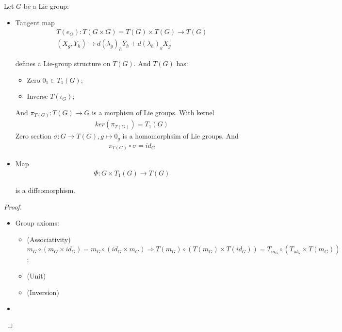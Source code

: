 \documentclass[Total.tex]{subfiles}
\begin{document}
				\begin{lemma} Let $G$ be a Lie group:
					\begin{itemize}
						\item Tangent map
						\begin{gather*}
							T(e_G):T(G\times G)=T(G)\times T(G)\rightarrow T(G)\\
							(X_g,Y_h)\mapsto d(\lambda_g)_h Y_h+d(\lambda_h)_g X_g
						\end{gather*}
						
						defines a Lie-group structure on $T(G)$. And $T(G)$ has:
						\begin{itemize}
							\item Zero $0_1\in T_1(G)$;
							\item Inverse $T(\iota_G)$;
						\end{itemize}
						And $\pi_{T(G)}:T(G)\rightarrow G$ is a morphism of Lie groups. With kernel
						\begin{gather*}
							ker(\pi_{T(G)})=T_1(G)
						\end{gather*}
						Zero section $\sigma:G\rightarrow T(G),g\mapsto 0_g$ is a homomorphsim of Lie groups. And
						\begin{gather*}
							\pi_{T(G)}\circ \sigma=id_{G}
						\end{gather*}
						
						
						\item Map
						\begin{gather*}
							\Phi:G\times T_1(G)\rightarrow T(G)
						\end{gather*}
						
						is a diffeomorphism.
					\end{itemize}
				\end{lemma}
				\begin{proof}
					\begin{itemize}
						\item Group axioms:
						\begin{itemize}
							\item (Associativity) $m_G\circ (m_G\times id_G)=m_G\circ(id_G\times m_G)\Rightarrow T(m_G)\circ (T(m_G)\times T(id_G))=T_{m_G}\circ (T_{id_G}\times T(m_G))$;
							\item (Unit)
							\item (Inversion) 
						\end{itemize}
						\item 
					\end{itemize}
				\end{proof}
				
\end{document}
